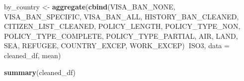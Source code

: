 \documentclass[]{article}
\newenvironment{Shaded}{\begin{snugshade}}{\end{snugshade}}
\newcommand{\DataTypeTok}[1]{\textcolor[rgb]{0.13,0.29,0.53}{#1}}
\newcommand{\KeywordTok}[1]{\textcolor[rgb]{0.13,0.29,0.53}{\textbf{#1}}}
\newcommand{\NormalTok}[1]{#1}
\newcommand{\OperatorTok}[1]{\textcolor[rgb]{0.81,0.36,0.00}{\textbf{#1}}}
\newcommand{\StringTok}[1]{\textcolor[rgb]{0.31,0.60,0.02}{#1}}
\begin{document}
\begin{Shaded}
\begin{Highlighting}[]
\NormalTok{by_country <-}\StringTok{ }\KeywordTok{aggregate}\NormalTok{(}\KeywordTok{cbind}\NormalTok{(VISA_BAN_NONE, VISA_BAN_SPECIFIC, VISA_BAN_ALL,}
\NormalTok{                              HISTORY_BAN_CLEANED,}
\NormalTok{                              CITIZEN_LIST_CLEANED, POLICY_LENGTH, POLICY_TYPE_NON, }
\NormalTok{                              POLICY_TYPE_COMPLETE, POLICY_TYPE_PARTIAL,}
\NormalTok{                              AIR, LAND, }
\NormalTok{                              SEA, REFUGEE, COUNTRY_EXCEP, WORK_EXCEP)}\OperatorTok{~}\NormalTok{ISO3, }\DataTypeTok{data =}\NormalTok{ cleaned_df, mean)}
\end{Highlighting}
\end{Shaded}

\begin{Shaded}
\begin{Highlighting}[]
\KeywordTok{summary}\NormalTok{(cleaned_df)}
\end{Highlighting}
\end{Shaded}
\end{document}
